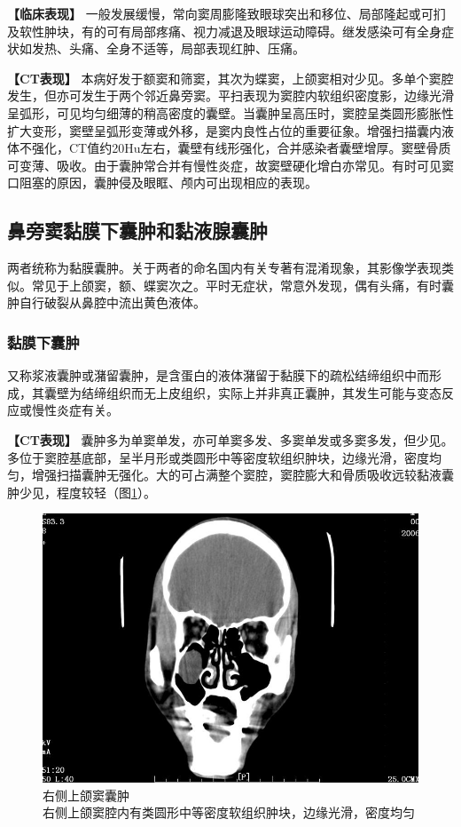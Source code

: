 \textbf{【临床表现】}
一般发展缓慢，常向窦周膨隆致眼球突出和移位、局部隆起或可扪及软性肿块，有的可有局部疼痛、视力减退及眼球运动障碍。继发感染可有全身症状如发热、头痛、全身不适等，局部表现红肿、压痛。

\textbf{【CT表现】}
本病好发于额窦和筛窦，其次为蝶窦，上颌窦相对少见。多单个窦腔发生，但亦可发生于两个邻近鼻旁窦。平扫表现为窦腔内软组织密度影，边缘光滑呈弧形，可见均匀细薄的稍高密度的囊壁。当囊肿呈高压时，窦腔呈类圆形膨胀性扩大变形，窦壁呈弧形变薄或外移，是窦内良性占位的重要征象。增强扫描囊内液体不强化，CT值约20Hu左右，囊壁有线形强化，合并感染者囊壁增厚。窦壁骨质可变薄、吸收。由于囊肿常合并有慢性炎症，故窦壁硬化增白亦常见。有时可见窦口阻塞的原因，囊肿侵及眼眶、颅内可出现相应的表现。

\subsection{鼻旁窦黏膜下囊肿和黏液腺囊肿}

两者统称为黏膜囊肿。关于两者的命名国内有关专著有混淆现象，其影像学表现类似。常见于上颌窦，额、蝶窦次之。平时无症状，常意外发现，偶有头痛，有时囊肿自行破裂从鼻腔中流出黄色液体。

\subsubsection{黏膜下囊肿}

又称浆液囊肿或潴留囊肿，是含蛋白的液体潴留于黏膜下的疏松结缔组织中而形成，其囊壁为结缔组织而无上皮组织，实际上并非真正囊肿，其发生可能与变态反应或慢性炎症有关。

\textbf{【CT表现】}
囊肿多为单窦单发，亦可单窦多发、多窦单发或多窦多发，但少见。多位于窦腔基底部，呈半月形或类圆形中等密度软组织肿块，边缘光滑，密度均匀，增强扫描囊肿无强化。大的可占满整个窦腔，窦腔膨大和骨质吸收远较黏液囊肿少见，程度较轻（图\ref{fig5-8}）。

\begin{figure}[!htbp]
 \centering
 \includegraphics[width=.7\textwidth,height=\textheight,keepaspectratio]{./images/Image00130.jpg}
 \captionsetup{justification=centering}
 \caption{右侧上颌窦囊肿\\{\small 右侧上颌窦腔内有类圆形中等密度软组织肿块，边缘光滑，密度均匀}}
 \label{fig5-8}
  \end{figure} 

